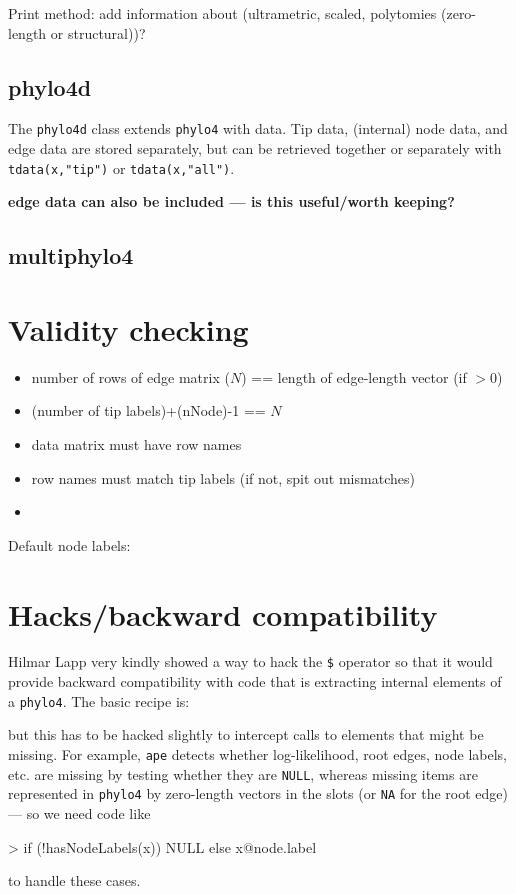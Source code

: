 \documentclass{article}
\newcommand{\code}[1]{{{\tt #1}}}
\begin{document}
Print method: add information about (ultrametric, scaled, polytomies (zero-length or structural))?

\subsection{phylo4d}

The \code{phylo4d} class extends \code{phylo4} with data.  Tip data, (internal) node data, and edge data are stored separately, but can be retrieved together or separately with \code{tdata(x,"tip")} or \code{tdata(x,"all")}.

\textbf{edge data can also be included --- is this
useful/worth keeping?}

\subsection{multiphylo4}

\section{Validity checking}

\begin{itemize}
\item number of rows of edge matrix ($N$) == length of edge-length vector (if $>0$)
\item (number of tip labels)+(nNode)-1 == $N$
\item data matrix must have row names
\item row names must match tip labels (if not, spit out mismatches)
\item 
\end{itemize}
 
Default node labels:

\section{Hacks/backward compatibility}

Hilmar Lapp very kindly showed a way to hack the \verb+$+ operator so that it would provide backward compatibility with code that is extracting internal elements of a \code{phylo4}. The basic recipe is: 

\begin{Schunk}
\end{Schunk}

but this has to be hacked slightly to intercept calls to elements that might be missing.  For example, \code{ape} detects whether log-likelihood, root edges, node labels, etc. are missing by testing whether they are \code{NULL}, whereas missing items are represented in \code{phylo4} by zero-length vectors in the slots (or \code{NA} for the root edge) --- so we need code like 
\begin{Schunk}
\begin{Sinput}
> if (!hasNodeLabels(x)) NULL else x@node.label
\end{Sinput}
\end{Schunk}
to handle these cases.
\end{document}
